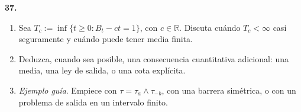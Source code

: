 \documentclass[11pt, letterpaper]{article}
\begin{document}
\newpage

\begin{ejercicio}
    \textbf{37.} 
    \begin{enumerate}
        \item Sea $T_c := \inf\{t \ge 0 : B_t - ct = 1\}$, con $c \in \mathbb{R}$. Discuta cuándo $T_c < \infty$ casi seguramente y cuándo puede tener media finita.
        \item Deduzca, cuando sea posible, una consecuencia cuantitativa adicional: una media, una ley de salida, o una cota explícita.
        \item \textit{Ejemplo guía}. Empiece con $\tau = \tau_a \wedge \tau_{-b}$, con una barrera simétrica, o con un problema de salida en un intervalo finito.
    \end{enumerate}
\end{ejercicio}

\vspace{5mm}
\end{document}
